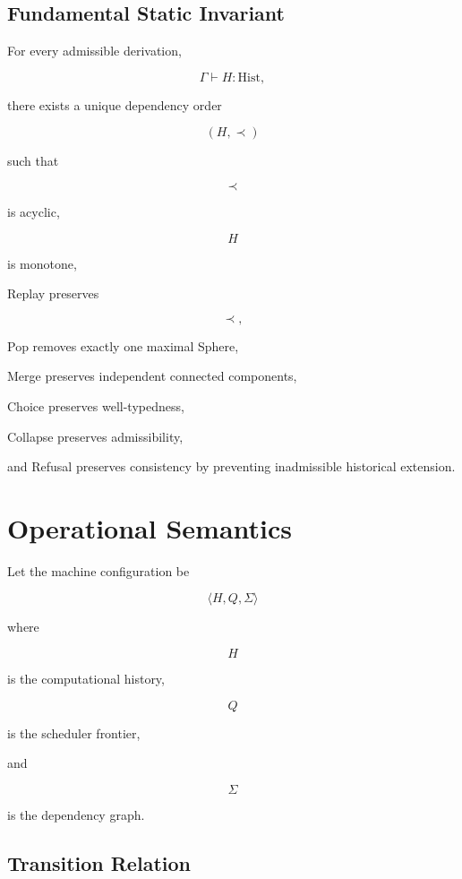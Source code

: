 \documentclass[12pt,oneside]{article}
\theoremstyle{definition}
\theoremstyle{remark}
\begin{document}
\subsection*{Fundamental Static Invariant}

For every admissible derivation,

\[
\Gamma
\vdash
H
:
\mathrm{Hist},
\]

there exists a unique dependency order

\[
(H,\prec)
\]

such that

\[
\prec
\]

is acyclic,

\[
H
\]

is monotone,

Replay preserves

\[
\prec,
\]

Pop removes exactly one maximal Sphere,

Merge preserves independent connected components,

Choice preserves well-typedness,

Collapse preserves admissibility,

and Refusal preserves consistency by preventing inadmissible historical
extension.

\section{Operational Semantics}

Let the machine configuration be

\[
\langle H,Q,\Sigma\rangle
\]

where

\[
H
\]

is the computational history,

\[
Q
\]

is the scheduler frontier,

and

\[
\Sigma
\]

is the dependency graph.

\subsection*{Transition Relation}
\end{document}
